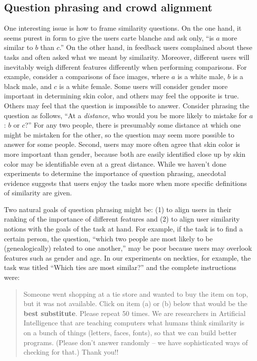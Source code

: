 \documentclass{article}
\begin{document}
\subsection{Question phrasing and crowd alignment}
One interesting issue is how to frame similarity questions.  On the one hand, it seems purest in form to give the users carte blanche and ask only, ``is $a$ more similar to $b$ than $c$.''  On the other hand, in feedback users complained about these tasks and often asked what we meant by similarity.  Moreover, different users will inevitably weigh different features differently when performing comparisons.  For example, consider a comparisons of face images, where $a$ is a white male, $b$ is a black male, and $c$ is a white female.  Some users will consider gender more important in determining skin color, and others may feel the opposite is true.  Others may feel that the question is impossible to answer.  Consider phrasing the question as follows, ``At a {\em distance}, who would you be more likely to mistake for $a$: $b$ or $c$?''  For any two people, there is presumably some distance at which one might be mistaken for the other, so the question may seem more possible to answer for some people.  Second, users may more often agree that skin color is more important than gender, because both are easily identified close up by skin color may be identifiable even at a great distance.  While we haven't done experiments to determine the importance of question phrasing, anecdotal evidence suggests that users enjoy the tasks more when more specific definitions of similarity are given.

Two natural goals of question phrasing might be: (1) to align users in their ranking of the importance of different features and (2) to align user similarity  notions with the goals of the task at hand.  For example, if the task is to find a certain person, the question, ``which two people are most likely to be (genealogically) related to one another,'' may be poor because users may overlook features such as gender and age.  In our experiments on neckties, for example, the task was titled ``Which ties are most similar?'' and the complete instructions were:

\begin{quote}
Someone went shopping at a tie store and wanted to buy the item
on top, but it was not available. Click on item (a) or (b) below that would be the
{\bf best substitute}. Please repeat 50 times. We are researchers in Artificial Intelligence that are teaching computers what humans think similarity is on a bunch of things (letters, faces, fonts), so that we can build better programs.  (Please
don't answer randomly -- we have sophisticated ways of checking for that.) Thank
you!!
\end{quote}
\end{document}
